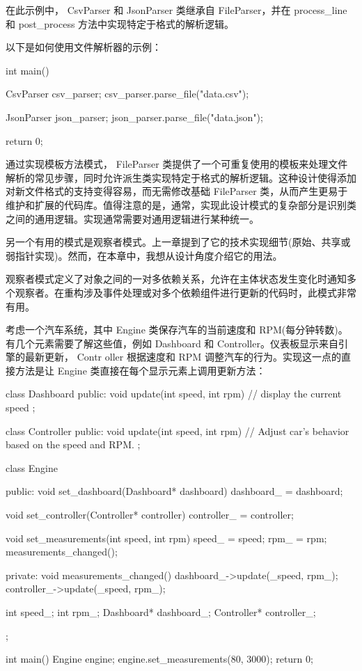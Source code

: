 在此示例中， CsvParser 和 JsonParser 类继承自 FileParser，并在 process\_line 和 post\_process 方法中实现特定于格式的解析逻辑。

以下是如何使用文件解析器的示例：

\begin{cpp}
int main() {
    CsvParser csv_parser;
    csv_parser.parse_file("data.csv");

    JsonParser json_parser;
    json_parser.parse_file("data.json");

    return 0;
}
\end{cpp}

通过实现模板方法模式， FileParser 类提供了一个可重复使用的模板来处理文件解析的常见步骤，同时允许派生类实现特定于格式的解析逻辑。这种设计使得添加对新文件格式的支持变得容易，而无需修改基础 FileParser 类，从而产生更易于维护和扩展的代码库。值得注意的是，通常，实现此设计模式的复杂部分是识别类之间的通用逻辑。实现通常需要对通用逻辑进行某种统一。

另一个有用的模式是观察者模式。上一章提到了它的技术实现细节(原始、共享或弱指针实现)。然而，在本章中，我想从设计角度介绍它的用法。

观察者模式定义了对象之间的一对多依赖关系，允许在主体状态发生变化时通知多个观察者。在重构涉及事件处理或对多个依赖组件进行更新的代码时，此模式非常有用。

考虑一个汽车系统，其中 Engine 类保存汽车的当前速度和 RPM(每分钟转数)。有几个元素需要了解这些值，例如 Dashboard 和 Controller。仪表板显示来自引擎的最新更新， Contr oller 根据速度和 RPM 调整汽车的行为。实现这一点的直接方法是让 Engine 类直接在每个显示元素上调用更新方法：

\begin{cpp}
class Dashboard {
public:
    void update(int speed, int rpm) {
        // display the current speed
    }
};

class Controller {
public:
    void update(int speed, int rpm) {
        // Adjust car's behavior based on the speed and RPM.
    }
};

class Engine {
public:
    void set_dashboard(Dashboard* dashboard) {
        dashboard_ = dashboard;
    }

    void set_controller(Controller* controller) {
        controller_ = controller;
    }

    void set_measurements(int speed, int rpm) {
        speed_ = speed;
        rpm_ = rpm;
        measurements_changed();
    }

private:
    void measurements_changed() {
        dashboard_->update(_speed, rpm_);
        controller_->update(_speed, rpm_);
    }

    int speed_;
    int rpm_;
    Dashboard* dashboard_;
    Controller* controller_;
};

int main() {
    Engine engine;
    engine.set_measurements(80, 3000);
    return 0;
}
\end{cpp}

